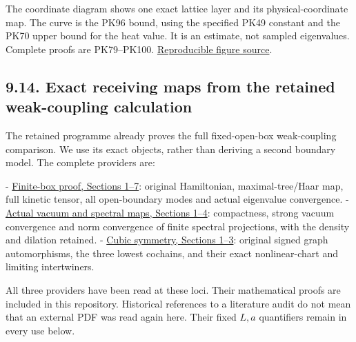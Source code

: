 \documentclass[11pt]{article}
\begin{document}
The coordinate diagram shows one exact lattice layer and its physical-coordinate map. The curve is the PK96 bound, using the specified PK49 constant and the PK70 upper bound for the heat value. It is an estimate, not sampled eigenvalues. Complete proofs are PK79–PK100. \href{https://github.com/KokunoYumeto/yang-mills-interacting-workbench/blob/main/yang-mills/continuations/20260930-s6-ns-moment-map-bridge/figures/packet_escape_figure.py}{Reproducible figure source}.

\subsection*{9.14. Exact receiving maps from the retained weak-coupling calculation}

The retained programme already proves the full fixed-open-box
weak-coupling comparison. We use its exact objects, rather than deriving
a second boundary model. The complete providers are:

- \href{https://github.com/KokunoYumeto/yang-mills-interacting-workbench/blob/c4a1fd2e34a5d75a5a1b04df4d097f992c345cc7/yang-mills/sources/ym_gap_primary_20260908/finite_box_weak_coupling_physical_gap.md}{Finite-box proof, Sections 1–7}:
  original Hamiltonian, maximal-tree/Haar map, full kinetic tensor,
  all open-boundary modes and actual eigenvalue convergence.
- \href{https://github.com/KokunoYumeto/yang-mills-interacting-workbench/blob/c4a1fd2e34a5d75a5a1b04df4d097f992c345cc7/yang-mills/sources/ym_gap_primary_20260908/weak_coupling_state_observable_limit.md}{Actual vacuum and spectral maps, Sections 1–4}:
  compactness, strong vacuum convergence and norm convergence of finite
  spectral projections, with the density and dilation retained.
- \href{https://github.com/KokunoYumeto/yang-mills-interacting-workbench/blob/c4a1fd2e34a5d75a5a1b04df4d097f992c345cc7/yang-mills/sources/ym_gap_primary_20260908/cubic_box_gap_symmetry.md}{Cubic symmetry, Sections 1–3}:
  original signed graph automorphisms, the three lowest cochains, and
  their exact nonlinear-chart and limiting intertwiners.

All three providers have been read at these loci. Their mathematical
proofs are included in this repository. Historical references to a
literature audit do not mean that an external PDF was read again here.
Their fixed \(L,a\) quantifiers remain in every use below.
\end{document}
